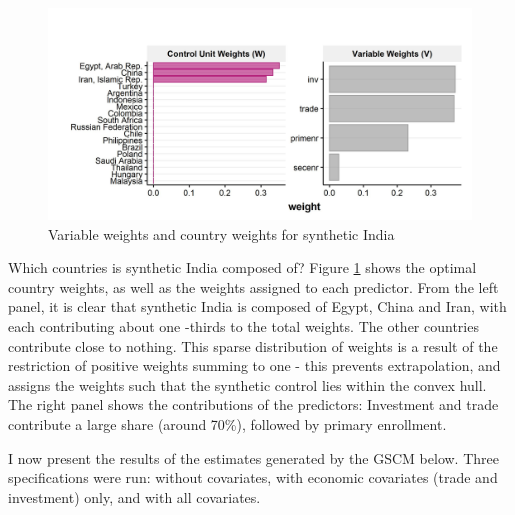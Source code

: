 \documentclass[12pt,nobind, a4paper]{reedthesis}
\begin{document}
 \newpage
 \begin{figure}

 {\centering \includegraphics[width=1\linewidth]{figure/weights} 

 }

 \caption{Variable weights and country weights for synthetic India}\label{fig:weights}
 \end{figure}
 Which countries is synthetic India composed of? Figure \ref{fig:weights} shows the optimal country weights, as well as the weights assigned to each predictor. From the left panel, it is clear that synthetic India is composed of Egypt, China and Iran, with each contributing about one -thirds to the total weights. The other countries contribute close to nothing. This sparse distribution of weights is a result of the restriction of positive weights summing to one - this prevents extrapolation, and assigns the weights such that the synthetic control lies within the convex hull. The right panel shows the contributions of the predictors: Investment and trade contribute a large share (around 70\%), followed by primary enrollment.
 \linebreak

 I now present the results of the estimates generated by the GSCM below. Three specifications were run: without covariates, with economic covariates (trade and investment) only, and with all covariates.
\end{document}
